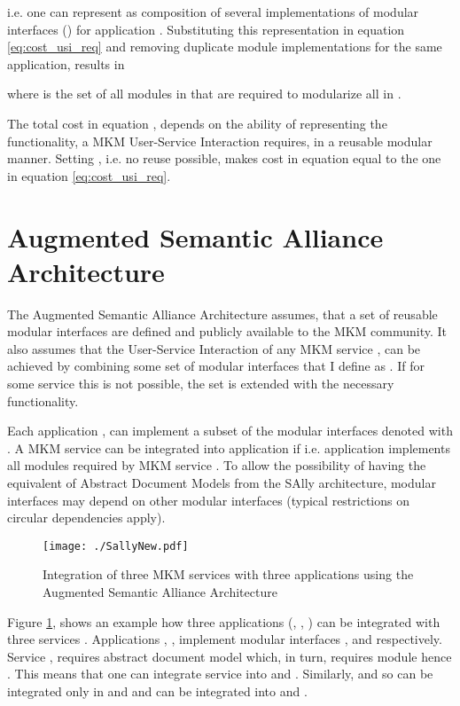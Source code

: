 \documentclass{llncs}
\begin{document}
i.e. one can represent  as composition of several implementations of 
modular interfaces () for application . Substituting this representation in equation \ref{eq:cost_usi_req} and removing duplicate module implementations for the same application, results in

where  is the set of all modules in  that are required to modularize all  in . 

The total cost in equation , depends on the ability of representing the functionality, a MKM User-Service Interaction requires, in a reusable modular manner. Setting , i.e. no reuse possible, makes cost in equation  equal to the one in equation \ref{eq:cost_usi_req}.

\section{Augmented Semantic Alliance Architecture}
\label{ammend-arch}
The Augmented Semantic Alliance Architecture assumes, that a set   of reusable modular interfaces are defined and publicly available to the MKM community. It also assumes that the User-Service Interaction of any MKM service , can be achieved by combining some set of modular interfaces that I define as . If for some service  this is not possible, the set  is extended with the necessary functionality.

Each application , can implement a subset of the modular interfaces denoted with . A MKM service  can be integrated into application  if  i.e. application  implements all modules required by MKM service . To allow the possibility of having the equivalent of Abstract Document Models from the SAlly architecture, modular interfaces may depend on other modular interfaces (typical restrictions on circular dependencies apply). 
\begin{figure}
\centering
\texttt{[image: ./SallyNew.pdf]}
\caption{Integration of three MKM services with three applications using the Augmented Semantic Alliance Architecture}
\label{fig:new_sally}
\end{figure}

Figure \ref{fig:new_sally}, shows an example how three applications (, , ) can be integrated with three services . 
Applications , ,  implement modular interfaces ,  and  respectively. Service , requires abstract document model  which, in turn, requires module  hence . This means that one can integrate service  into  and . Similarly,  and so can be integrated only in  and  and can be integrated into  and .
\end{document}
